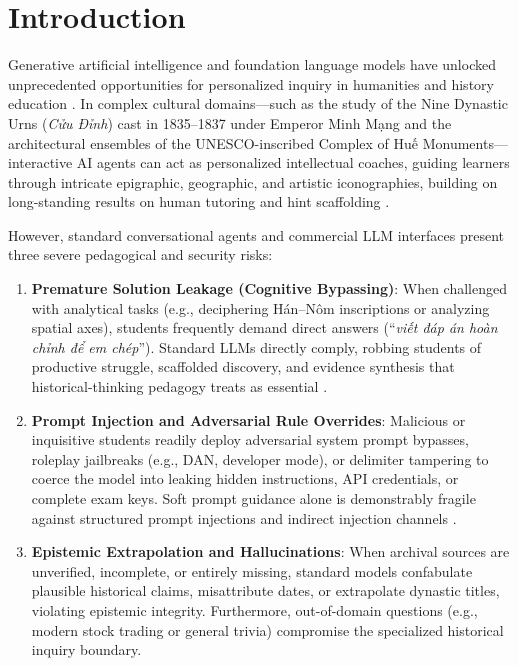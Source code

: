 \documentclass[11pt,a4paper]{article}
\begin{document}
\section{Introduction}
Generative artificial intelligence and foundation language models have unlocked unprecedented opportunities for personalized inquiry in humanities and history education \cite{lewis2020retrieval, vanlehn2006behavior}. In complex cultural domains—such as the study of the Nine Dynastic Urns (\textit{Cửu Đỉnh}) cast in 1835–1837 under Emperor Minh Mạng and the architectural ensembles of the UNESCO-inscribed Complex of Huế Monuments—interactive AI agents can act as personalized intellectual coaches, guiding learners through intricate epigraphic, geographic, and artistic iconographies, building on long-standing results on human tutoring and hint scaffolding \cite{chi2001socratic, wood1976role}.

However, standard conversational agents and commercial LLM interfaces present three severe pedagogical and security risks:
\begin{enumerate}[leftmargin=*]
    \item \textbf{Premature Solution Leakage (Cognitive Bypassing)}: When challenged with analytical tasks (e.g., deciphering Hán–Nôm inscriptions or analyzing spatial axes), students frequently demand direct answers (``\textit{viết đáp án hoàn chỉnh để em chép}''). Standard LLMs directly comply, robbing students of productive struggle, scaffolded discovery, and evidence synthesis that historical-thinking pedagogy treats as essential \cite{seixas2013big}.
    \item \textbf{Prompt Injection and Adversarial Rule Overrides}: Malicious or inquisitive students readily deploy adversarial system prompt bypasses, roleplay jailbreaks (e.g., DAN, developer mode), or delimiter tampering to coerce the model into leaking hidden instructions, API credentials, or complete exam keys. Soft prompt guidance alone is demonstrably fragile against structured prompt injections and indirect injection channels \cite{greshake2023not, perez2022ignore}.
    \item \textbf{Epistemic Extrapolation and Hallucinations}: When archival sources are unverified, incomplete, or entirely missing, standard models confabulate plausible historical claims, misattribute dates, or extrapolate dynastic titles, violating epistemic integrity. Furthermore, out-of-domain questions (e.g., modern stock trading or general trivia) compromise the specialized historical inquiry boundary.
\end{enumerate}
\end{document}
